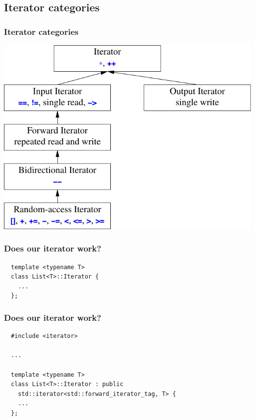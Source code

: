 \subsection{Iterator categories}
\begin{frame}
  \frametitle{Iterator categories}
  \centering
  \includegraphics[height=0.8\textheight]{img/iterators.png}
\end{frame}

\begin{frame}[fragile]
  \frametitle{Does our iterator work?}
\begin{lstlisting}
  template <typename T>
  class List<T>::Iterator {
    ...
  };
\end{lstlisting}
\end{frame}

\begin{frame}[fragile]
  \frametitle{Does our iterator work?}
\begin{lstlisting}
  #include <iterator>

  ...
  
  template <typename T>
  class List<T>::Iterator : public
    std::iterator<std::forward_iterator_tag, T> {
    ...
  };
\end{lstlisting}
\end{frame}

